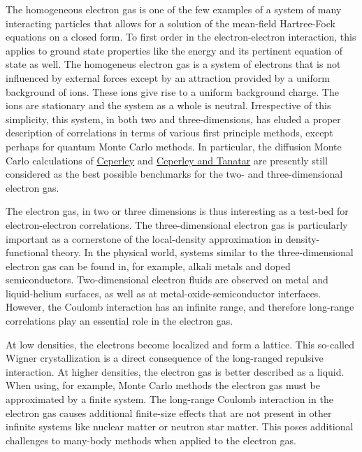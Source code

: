 \noindent
The homogeneous electron gas is one of the few examples of a system of many
interacting particles that allows for a solution of the mean-field
Hartree-Fock equations on a closed form.  To first order in the
electron-electron interaction, this applies to ground state properties
like the energy and its pertinent equation of state as well.  The
homogeneus electron gas is a system of electrons that is not
influenced by external forces except by an attraction provided by a
uniform background of ions. These ions give rise to a uniform
background charge.  The ions are stationary and the system as a whole
is neutral.
Irrespective of this simplicity, this system, in both two and
three-dimensions, has eluded a proper description of correlations in
terms of various first principle methods, except perhaps for quantum
Monte Carlo methods. In particular, the diffusion Monte Carlo
calculations of \href{{http://journals.aps.org/prl/abstract/10.1103/PhysRevLett.45.566}}{Ceperley} 
and \href{{http://journals.aps.org/prb/abstract/10.1103/PhysRevB.39.5005}}{Ceperley and Tanatar} 
are presently still considered as the
best possible benchmarks for the two- and three-dimensional electron
gas. 



The electron gas, in 
two or three dimensions is thus interesting as a test-bed for 
electron-electron correlations. The three-dimensional 
electron gas is particularly important as a cornerstone 
of the local-density approximation in density-functional 
theory. In the physical world, systems 
similar to the three-dimensional electron gas can be 
found in, for example, alkali metals and doped 
semiconductors. Two-dimensional electron fluids are 
observed on metal and liquid-helium surfaces, as well as 
at metal-oxide-semiconductor interfaces. However, the Coulomb 
interaction has an infinite range, and therefore 
long-range correlations play an essential role in the
electron gas. 




At low densities, the electrons become 
localized and form a lattice. This so-called Wigner 
crystallization is a direct consequence 
of the long-ranged repulsive interaction. At higher
densities, the electron gas is better described as a
liquid.
When using, for example, Monte Carlo methods the electron gas must be approximated 
by a finite system. The long-range Coulomb interaction 
in the electron gas causes additional finite-size effects  that are not
present in other infinite systems like nuclear matter or neutron star matter.
This poses additional challenges to many-body methods when applied 
to the electron gas.





